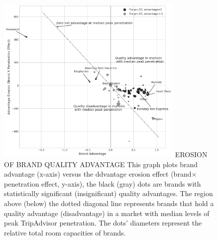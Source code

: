 \documentclass{informs_mod} %
\begin{document}
\begin{figure}[htp]
\FIGURE
{\includegraphics[width=0.8\textwidth,height=\textheight,keepaspectratio]{./Figures/brand_coeff2.png}}
{EROSION OF BRAND QUALITY ADVANTAGE\label{fig:brandvspenetrate}}
{This graph plots brand advantage (x-axis) versus the ddvantage erosion effect (brand$\times$penetration effect, y-axis), the black (gray) dots are brands with statistically significant (insignificant) quality advantages. The region above (below) the dotted diagonal line represents brands that hold a quality advantage (disadvantage) in a market with median levels of peak TripAdvisor penetration. The dots' diameters represent the relative total room capacities of brands.}
\end{figure}
\clearpage

\ACKNOWLEDGMENT{%
}%


%
%
%



\end{document}

